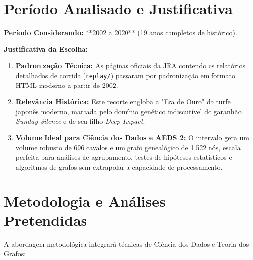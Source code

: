 \documentclass[11pt,a4paper]{article}
\begin{document}
\section{Período Analisado e Justificativa}

\textbf{Período Considerando:} **2002 a 2020** (19 anos completos de histórico).

\textbf{Justificativa da Escolha:}
\begin{enumerate}
    \item \textbf{Padronização Técnica:} As páginas oficiais da JRA contendo os relatórios detalhados de corrida (\texttt{replay/}) passaram por padronização em formato HTML moderno a partir de 2002.
    \item \textbf{Relevância Histórica:} Este recorte engloba a "Era de Ouro" do turfe japonês moderno, marcada pelo domínio genético indiscutível do garanhão \emph{Sunday Silence} e de seu filho \emph{Deep Impact}.
    \item \textbf{Volume Ideal para Ciência dos Dados e AEDS 2:} O intervalo gera um volume robusto de 696 cavalos e um grafo genealógico de 1.522 nós, escala perfeita para análises de agrupamento, testes de hipóteses estatísticos e algoritmos de grafos sem extrapolar a capacidade de processamento.
\end{enumerate}

\section{Metodologia e Análises Pretendidas}

A abordagem metodológica integrará técnicas de Ciência dos Dados e Teoria dos Grafos:
\end{document}
